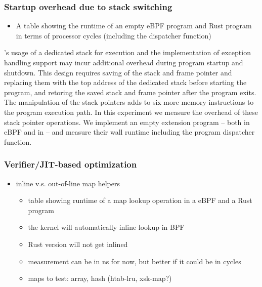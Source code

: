 \subsubsection{Startup overhead due to stack switching}
\begin{itemize}
    \item A table showing the runtime of an empty eBPF program and Rust program
        in terms of processor cycles (including the dispatcher function)
\end{itemize}

\projname{}'s usage of a dedicated stack for execution and the implementation
    of exception handling support may incur additional overhead during program
    startup and shutdown.
This design requires saving of the stack and frame pointer and replacing them
    with the top address of the dedicated stack before starting the program,
    and retoring the saved stack and frame pointer after the program exits.
The manipulation of the stack pointers adds to six more memory instructions to
    the program execution path.
In this experiment we measure the overhead of these stack pointer operations.
We implement an empty extension program -- both in eBPF and in \projname{} --
    and measure their wall runtime including the program dispatcher function.


\subsubsection{Verifier/JIT-based optimization}
\begin{itemize}
    \item inline v.s. out-of-line map helpers
        \begin{itemize}
            \item table showing runtime of a map lookup operation in a eBPF and
                a Rust program
            \item the kernel will automatically inline lookup in BPF
            \item Rust version will not get inlined
            \item measurement can be in ns for now, but better if it could be
                in cycles
            \item maps to test: array, hash (htab-lru, xsk-map?)
        \end{itemize}
\end{itemize}

